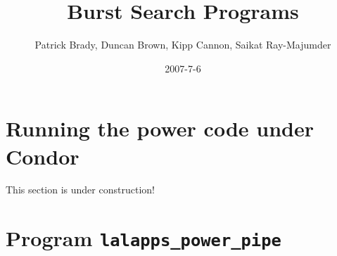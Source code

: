 \documentclass{article}
\title{Burst Search Programs}
\author{Patrick Brady, Duncan Brown, Kipp Cannon, Saikat Ray-Majumder}
\date{2007-7-6}
\newcommand{\prog}[1]{\texttt{#1}}
\begin{document}
\maketitle

 
\section{Running the power code under Condor}


%
%

This section is under construction!


\section{Program \prog{lalapps\_power\_pipe}}
\end{document}
